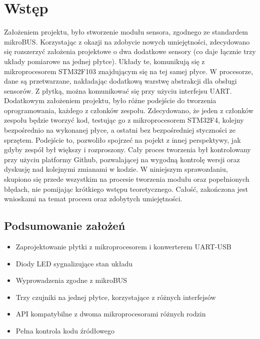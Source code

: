 \chapter{Wstęp}
\label{cha:introduction}
Założeniem projektu, było stworzenie modułu sensora, zgodnego ze standardem mikroBUS\texttrademark. Korzystając z okazji na zdobycie nowych umiejętności, zdecydowano się rozszerzyć założenia projektowe o dwa dodatkowe sensory (co daje łącznie trzy układy pomiarowe na jednej płytce). Układy te, komunikują się z mikroprocesorem STM32F103 znajdującym się na tej samej płyce. W procesorze, dane są przetwarzane, nakładając dodatkową warstwę abstrakcji dla obsługi sensorów. Z płytką, można komunikować się przy użyciu interfejsu UART. Dodatkowym założeniem projektu, było różne podejście do tworzenia oprogramowania, każdego z członków zespołu. Zdecydowano, że jeden z członków zespołu będzie tworzyć kod, testując go z mikroprocesorem STM32F4, kolejny bezpośrednio na wykonanej płyce, a ostatni bez bezpośredniej styczności ze sprzętem. Podejście to, pozwoliło spojrzeć na pojekt z innej perspektywy, jak gdyby zespół był większy i rozproszony. Cały proces tworzenia był kontrolowany przy użyciu platformy Github, pozwalającej na wygodną kontrolę wersji oraz dyskusję nad kolejnymi zmianami w kodzie. \newline\newline
W niniejszym sprawozdaniu, skupiono się przede wszystkim na procesie tworzenia modułu oraz popełnionych błędach, nie pomijając krótkiego wstępu teoretycznego. Całość, zakończona jest wnioskami na temat procesu oraz zdobytych umiejętności.
\section{Podsumowanie założeń}
\begin{itemize}
    \item Zaprojektowanie płytki z mikroprocesorem i konwerterem UART-USB
    \item Diody LED sygnalizujące stan układu
    \item Wyprowadzenia zgodne z mikroBUS\texttrademark
    \item Trzy czujniki na jednej płytce, korzystające z różnych interfejsów
    \item API kompatybilne z dwoma mikroprocesorami różnych rodzin
    \item Pełna kontrola kodu źródłowego
\end{itemize}
